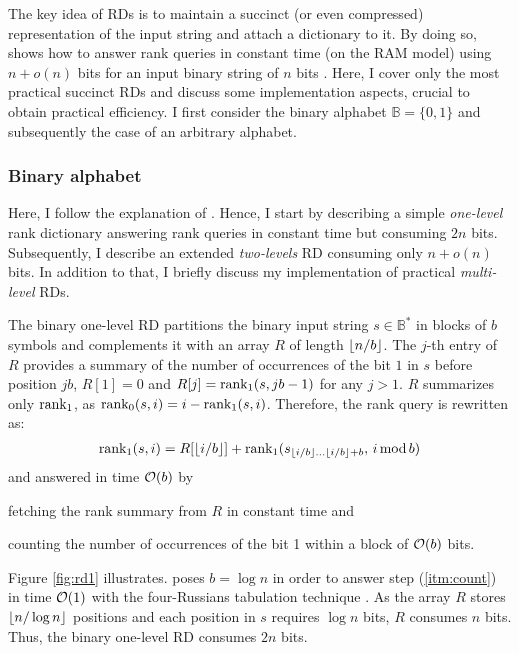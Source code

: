The key idea of RDs is to maintain a succinct (or even compressed) representation of the input string and attach a dictionary to it.
By doing so, \citeauthor{Jacobson1989} shows how to answer rank queries in constant time (on the RAM model) using $n+o(n)$ bits for an input binary string of $n$ bits \citep{Jacobson1989}.
Here, I cover only the most practical succinct RDs and discuss some implementation aspects, crucial to obtain practical efficiency.
I first consider the binary alphabet $\mathbb{B} = \{ 0, 1 \}$ and subsequently the case of an arbitrary alphabet.

\subsubsection{Binary alphabet}
\label{sec:index:rd:binary}

Here, I follow the explanation of \citep{Navarro2007}.
Hence, I start by describing a simple \emph{one-level} rank dictionary answering rank queries in constant time but consuming $2n$ bits.
Subsequently, I describe an extended \emph{two-levels} RD consuming only $n + o(n)$ bits.
In addition to that, I briefly discuss my implementation of practical \emph{multi-level} RDs.

The binary one-level RD partitions the binary input string $s \in \mathbb{B}^*$ in blocks of $b$ symbols and
complements it with an array $R$ of length $\left \lfloor n/b \right \rfloor$.
The $j$-th entry of $R$ provides a summary of the number of occurrences of the bit $1$ in $s$ before position $j b$, \ie $R[1] = 0$ and $R[j] = \text{rank}_1(s, j b - 1)$ for any $j > 1$.
$R$ summarizes only $\text{rank}_1$, as $\text{rank}_0(s, i) = i - \text{rank}_1(s, i)$.
Therefore, the rank query is rewritten as:
\begin{eqnarray}
\rank_1(s,i) = R[\xfloor{i/b}] + \rank_1(s_{\xfloor{i/b} \dots \xfloor{i/b}+b}, \, i \imod{b})
\end{eqnarray}
and answered in time $\mathcal{O}(b)$ by 
\begin{inparaenum}[(i)]
\item \label{itm:fetch} fetching the rank summary from $R$ in constant time and
\item \label{itm:count} counting the number of occurrences of the bit 1 within a block of $\mathcal{O}(b)$ bits.
\end{inparaenum}
Figure \ref{fig:rd1} illustrates.
\citeauthor{Jacobson1989} poses $b=\log{n}$ in order to answer step (\ref{itm:count}) in time $\mathcal{O}(1)$ with the four-Russians tabulation technique \citep{Arlazarov1975}.
As the array $R$ stores $\left \lfloor n/\log{n} \right \rfloor$ positions and each position in $s$ requires $\log{n}$ bits, $R$ consumes $n$ bits.
Thus, the binary one-level RD consumes $2n$ bits.

